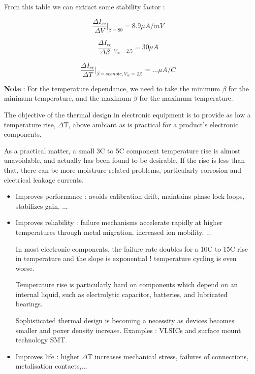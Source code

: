 From this table we can extract some stability factor :

\begin{equation}
\frac{\Delta I_{cc}}{\Delta V}\vert _{\beta = 80} = 8.9 \mu A / mV
\end{equation}

\begin{equation}
\frac{\Delta I_{cc}}{\Delta \beta}\vert _{V_{cc} = 2.5} = 30 \mu A
\end{equation}

\begin{equation}
\frac{\Delta I_{cc}}{\Delta T}\vert _{\beta = see note, V_{cc} = 2.5 } = \ldots \mu A / C
\end{equation}

\textbf{Note} : For the temperature dependance, we need to take the minimum $\beta$ for the minimum temperature, and the maximum $\beta$ for the maximum temperature.






The objective of the thermal design in electronic equipment is to
provide as low a temperature rise, $\Delta$T, above ambiant as is
practical for a product's electronic components.

As a practical matter, a small 3C to 5C component
temperature rise is almost unavoidable, and actually has been found
to be desirable. If the rise is less than that, there can be more
moistrure-related problems, particularly corrosion and electrical
leakage currents.

\begin{itemize}
	\item Improves performance : avoids calibration drift, maintains
	phase lock loops, stabilizes gain, ...

	\item Improves reliability : failure mechanisms accelerate
	rapidly at higher temperatures through metal migration, increased
	ion mobility, ...

	In most electronic components, the failure rate doubles for a
	10C to 15C rise in temperature and the slope is
	exponential ! temperature cycling is even worse.

	Temperature rise is particularly hard on components which depend
	on an internal liquid, such as electrolytic capacitor,
	batteries, and lubricated bearings.

	Sophisticated thermal design is becoming a necessity as devices
	becomes smaller and poxer density increase. Examples : VLSICs and
	surface mount technology SMT.

	\item Improves life : higher $\Delta$T increases mechanical
	stress, failures of connections, metalisation contacts,...
\end{itemize}

